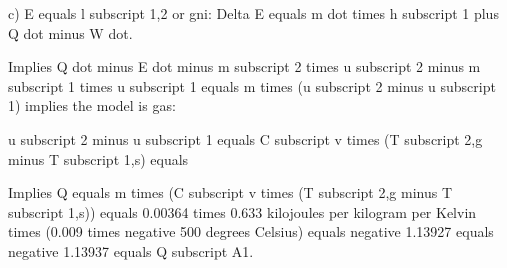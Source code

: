 c) E equals l subscript 1,2 or gni: Delta E equals m dot times h subscript 1 plus Q dot minus W dot.

Implies Q dot minus E dot minus m subscript 2 times u subscript 2 minus m subscript 1 times u subscript 1 equals m times (u subscript 2 minus u subscript 1) implies the model is gas:

u subscript 2 minus u subscript 1 equals C subscript v times (T subscript 2,g minus T subscript 1,s) equals

Implies Q equals m times (C subscript v times (T subscript 2,g minus T subscript 1,s)) equals 0.00364 times 0.633 kilojoules per kilogram per Kelvin times (0.009 times negative 500 degrees Celsius) equals negative 1.13927 equals negative 1.13937 equals Q subscript A1.